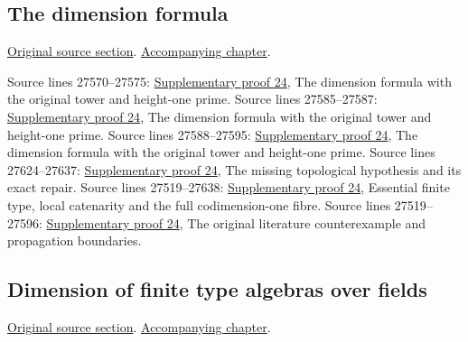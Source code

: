 \subsection{The dimension formula}
\hypertarget{algebra-source-section-dimension-formula}{}
\noindent\href{https://github.com/stacks/stacks-project/blob/a04446e57ec1fbc252a871afcec7752fb2807b14/algebra.tex\#L27512}{Original source section}. \href{algebra.pdf\#nameddest=section-dimension-formula}{Accompanying chapter}.

\begin{AlgebraSourceRoutes}
 Source lines 27570--27575: \hyperlink{algebra_dimension_maps_notes_20260928}{Supplementary proof 24}, The dimension formula with the original tower and height-one prime.
 Source lines 27585--27587: \hyperlink{algebra_dimension_maps_notes_20260928}{Supplementary proof 24}, The dimension formula with the original tower and height-one prime.
 Source lines 27588--27595: \hyperlink{algebra_dimension_maps_notes_20260928}{Supplementary proof 24}, The dimension formula with the original tower and height-one prime.
 Source lines 27624--27637: \hyperlink{algebra_dimension_maps_notes_20260928}{Supplementary proof 24}, The missing topological hypothesis and its exact repair.
 Source lines 27519--27638: \hyperlink{algebra_dimension_maps_notes_20260928}{Supplementary proof 24}, Essential finite type, local catenarity and the full codimension-one fibre.
 Source lines 27519--27596: \hyperlink{algebra_dimension_maps_notes_20260928}{Supplementary proof 24}, The original literature counterexample and propagation boundaries.
\end{AlgebraSourceRoutes}

\subsection{Dimension of finite type algebras over fields}
\hypertarget{algebra-source-section-dimension-finite-type-algebras}{}
\noindent\href{https://github.com/stacks/stacks-project/blob/a04446e57ec1fbc252a871afcec7752fb2807b14/algebra.tex\#L27648}{Original source section}. \href{algebra.pdf\#nameddest=section-dimension-finite-type-algebras}{Accompanying chapter}.

